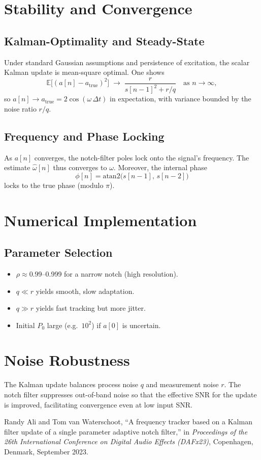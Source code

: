 \documentclass{article}
\begin{document}
\section{Stability and Convergence}

\subsection{Kalman-Optimality and Steady-State}
Under standard Gaussian assumptions and persistence of excitation, the scalar Kalman update is mean-square optimal.  One shows
\[
\mathbb{E}\bigl[(a[n] - a_{\mathrm{true}})^2\bigr]
\;\longrightarrow\;
\frac{r}{s[n-1]^2 + r/q}
\quad\text{as }n\to\infty,
\]
so \(a[n]\to a_{\mathrm{true}} = 2\cos(\omega\,\Delta t)\) in expectation, with variance bounded by the noise ratio \(r/q\).

\subsection{Frequency and Phase Locking}
As \(a[n]\) converges, the notch-filter poles lock onto the signal’s frequency.  The estimate \(\hat\omega[n]\) thus converges to \(\omega\).  Moreover, the internal phase
\[
\phi[n] = \mathrm{atan2}\bigl(s[n-1],\,s[n-2]\bigr)
\]
locks to the true phase (modulo \(\pi\)).

\section{Numerical Implementation}

\subsection{Parameter Selection}
\begin{itemize}
  \item \(\rho\approx0.99\)–0.999 for a narrow notch (high resolution).  
  \item \(q\ll r\) yields smooth, slow adaptation.  
  \item \(q\gg r\) yields fast tracking but more jitter.  
  \item Initial \(P_0\) large (e.g.\ \(10^2\)) if \(a[0]\) is uncertain.  
\end{itemize}


\section{Noise Robustness}

The Kalman update balances process noise \(q\) and measurement noise \(r\).  The notch filter suppresses out-of-band noise so that the effective SNR for the update is improved, facilitating convergence even at low input SNR.

\begin{thebibliography}{9}
Randy Ali and Tom van Waterschoot,  
``A frequency tracker based on a Kalman filter update of a single parameter adaptive notch filter,''  
in \emph{Proceedings of the 26th International Conference on Digital Audio Effects (DAFx23)},  
Copenhagen, Denmark, September 2023.
\end{thebibliography}
\end{document}
